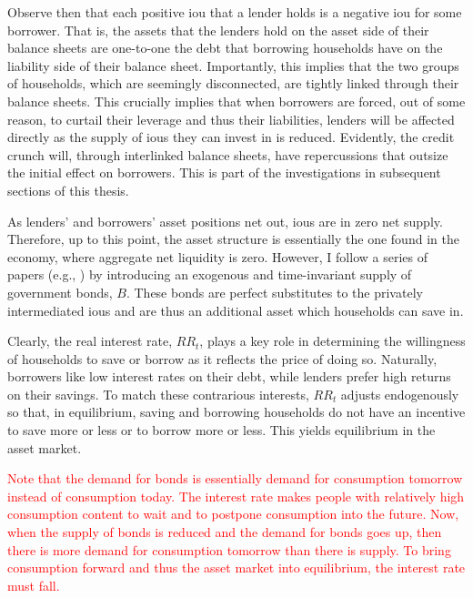 \documentclass[12pt]{article} %
\numberwithin{equation}{section} %
\begin{document}
Observe then that each positive \Gls{iou} that a lender holds is a negative \Gls{iou} for some borrower. That is, the assets that the lenders hold on the asset side of their balance sheets are one-to-one the debt that borrowing households have on the liability side of their balance sheet. Importantly, this implies that the two groups of households, which are seemingly disconnected, are tightly linked through their balance sheets. This crucially implies that when borrowers are forced, out of some reason, to curtail their leverage and thus their liabilities, lenders will be affected directly as the supply of \Gls{iou}s they can invest in is reduced. Evidently, the credit crunch will, through interlinked balance sheets, have repercussions that outsize the initial effect on borrowers. This is part of the investigations in subsequent sections of this thesis.

As lenders' and borrowers' asset positions net out, \Gls{iou}s are in zero net supply. Therefore, up to this point, the asset structure is essentially the one found in the \textcite{huggett1993} economy, where aggregate net liquidity is zero. However, I follow a series of papers (e.g.\cite{gl2017}, \cite{bayer2023}) by introducing an exogenous and time-invariant supply of government bonds, $B$. These bonds are perfect substitutes to the privately intermediated \Gls{iou}s and are thus an additional asset which households can save in. %

Clearly, the real interest rate, $RR_t$, plays a key role in determining the willingness of households to save or borrow as it reflects the price of doing so. Naturally, borrowers like low interest rates on their debt, while lenders prefer high returns on their savings. To match these contrarious interests, $RR_t$ adjusts endogenously so that, in equilibrium, saving and borrowing households do not have an incentive to save more or less or to borrow more or less. This yields equilibrium in the asset market.

\textcolor{red}{Note that the demand for bonds is essentially demand for consumption tomorrow instead of consumption today. The interest rate makes people with relatively high consumption content to wait and to postpone consumption into the future. Now, when the supply of bonds is reduced and the demand for bonds goes up, then there is more demand for consumption tomorrow than there is supply. To bring consumption forward and thus the asset market into equilibrium, the interest rate must fall.}
\end{document}
